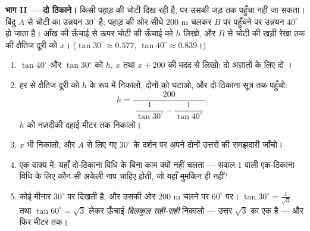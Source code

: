 \begin{problem}
\medskip
\noindent\textbf{भाग II --- दो ठिकाने।}
किसी पहाड़ की चोटी दिख रही है, पर उसकी जड़ तक पहुँचा नहीं जा सकता।
बिंदु $A$ से चोटी का उन्नयन $30^\circ$ है; पहाड़ की ओर सीधे $200$ m
चलकर $B$ पर पहुँचने पर उन्नयन $40^\circ$ हो जाता है। आँख की ऊँचाई से
ऊपर चोटी की ऊँचाई को $h$ लिखो, और $B$ से चोटी की खड़ी रेखा तक की
क्षैतिज दूरी को $x$। ($\tan 30^\circ \approx 0.577$,
$\tan 40^\circ \approx 0.839$।)
\begin{enumerate}[resume]
  \item $\tan 40^\circ$ और $\tan 30^\circ$ को $h$, $x$ तथा
        $x + 200$ की मदद से लिखो: दो अज्ञातों के लिए दो ।
  \item हर  से क्षैतिज दूरी को $h$ के रूप में निकालो, दोनों को
        घटाओ, और दो-ठिकाना सूत्र तक पहुँचो:
        \[
        h = \frac{200}
        {\ \dfrac{1}{\tan 30^\circ} - \dfrac{1}{\tan 40^\circ}\ } .
        \]
        $h$ को नज़दीकी दहाई मीटर तक निकालो।
  \item $x$ भी निकालो, और $A$ से लिए गए $30^\circ$ के दर्शन पर अपने
        दोनों उत्तरों की समझदारी जाँचो।
  \item एक वाक्य में: यहाँ दो-ठिकाना विधि के बिना काम क्यों नहीं
        चलता --- सवाल 1 वाली एक-ठिकाना विधि के लिए कौन-सी अकेली नाप
        चाहिए होती, जो यहाँ मुमकिन ही नहीं?
  \item कोई मीनार $30^\circ$ पर दिखती है, और उसकी ओर $200$ m चलने
        पर $60^\circ$ पर। $\tan 30^\circ = \frac{1}{\sqrt3}$ तथा
        $\tan 60^\circ = \sqrt3$ लेकर ऊँचाई \emph{बिलकुल सही-सही}
        निकालो --- उत्तर $\sqrt3$ का एक  है --- और फिर मीटर तक।
\end{enumerate}


\end{problem}
